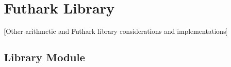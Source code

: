 \section{Futhark Library}
\label{sec:cons}
[Other arithmetic and Futhark library considerations and implementations]

\subsection{Library Module}




